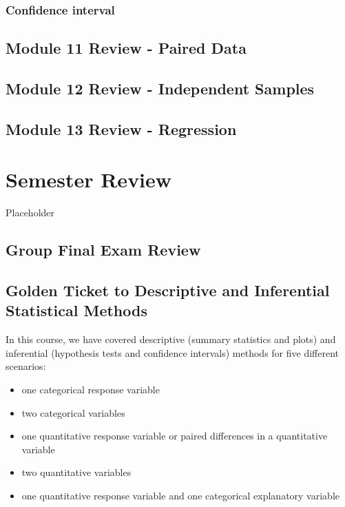 \documentclass[
]{report}
\providecommand{\tightlist}{%
  \setlength{\itemsep}{0pt}\setlength{\parskip}{0pt}}
\begin{document}
\subsection*{Confidence interval}\label{confidence-interval-9}

\section{Module 11 Review - Paired Data}\label{module-11-review---paired-data}

\section{Module 12 Review - Independent Samples}\label{module-12-review---independent-samples}

\section{Module 13 Review - Regression}\label{module-13-review---regression}

\chapter{Semester Review}\label{semester-review}

Placeholder

\section{Group Final Exam Review}\label{group-final-exam-review}

\section{Golden Ticket to Descriptive and Inferential Statistical Methods}\label{golden-ticket-to-descriptive-and-inferential-statistical-methods}

In this course, we have covered descriptive (summary statistics and plots) and inferential (hypothesis tests and confidence intervals) methods for five different scenarios:

\begin{itemize}
\tightlist
\item
  one categorical response variable
\item
  two categorical variables
\item
  one quantitative response variable or paired differences in a quantitative variable
\item
  two quantitative variables
\item
  one quantitative response variable and one categorical explanatory variable
\end{itemize}
\end{document}
